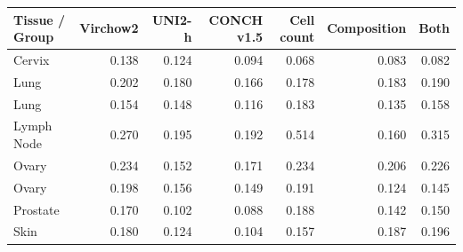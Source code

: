 \begin{tabular}{lrrrrrr}
\toprule
Tissue / Group & Virchow2 & UNI2-h & CONCH v1.5 & Cell count & Composition & Both \\
\midrule
Cervix & 0.138 & 0.124 & 0.094 & 0.068 & 0.083 & 0.082 \\
Lung & 0.202 & 0.180 & 0.166 & 0.178 & 0.183 & 0.190 \\
Lung & 0.154 & 0.148 & 0.116 & 0.183 & 0.135 & 0.158 \\
Lymph Node & 0.270 & 0.195 & 0.192 & 0.514 & 0.160 & 0.315 \\
Ovary & 0.234 & 0.152 & 0.171 & 0.234 & 0.206 & 0.226 \\
Ovary & 0.198 & 0.156 & 0.149 & 0.191 & 0.124 & 0.145 \\
Prostate & 0.170 & 0.102 & 0.088 & 0.188 & 0.142 & 0.150 \\
Skin & 0.180 & 0.124 & 0.104 & 0.157 & 0.187 & 0.196 \\
\bottomrule
\end{tabular}

